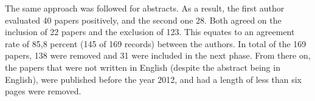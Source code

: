 \documentclass[a4paper,11pt,article,oneside]{memoir}
\begin{document}
The same approach was followed for abstracts. As a result, the first author evaluated 40 papers positively, and the second one 28. Both agreed on the inclusion of 22 papers and the exclusion of 123. This equates to an agreement rate of 85,8 percent (145 of 169 records) between the authors. In total of the 169 papers, 138 were removed and 31 were included in the next phase. From there on, the papers that were not written in English (despite the abstract being in English), were published before the year 2012, and had a length of less than six pages were removed.








\end{document}
